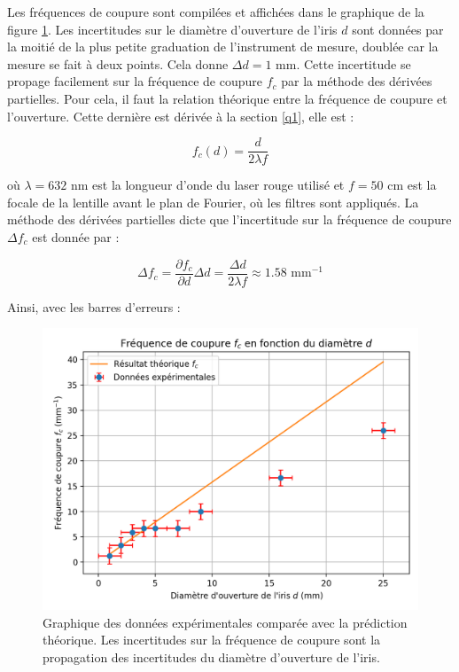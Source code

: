 \documentclass[11pt,letterpaper]{article}
\begin{document}
Les fréquences de coupure sont compilées et affichées dans le graphique de la figure \ref{plot}. Les incertitudes sur
le diamètre d'ouverture de l'iris $d$ sont données par la moitié de la plus petite graduation de l'instrument de mesure,
doublée car la mesure se fait à deux points. Cela donne $\Delta d = 1$ mm. Cette incertitude se propage facilement sur
la fréquence de coupure $f_c$  par la méthode des dérivées partielles. Pour cela, il faut la relation théorique entre la
fréquence de coupure et l'ouverture. Cette dernière est dérivée à la section \ref{q1}, elle est :

\begin{equation}
  f_c(d)= \frac{d}{2\lambda f}
  \label{eqfcoup}
\end{equation}

où $\lambda = 632$ nm est la longueur d'onde du laser rouge utilisé et $f = 50$ cm est la focale de la lentille avant le
plan de Fourier, où les filtres sont appliqués. La méthode des dérivées partielles dicte que l'incertitude sur la
fréquence de coupure $\Delta f_c$ est donnée par :

\begin{equation}
  \Delta f_c = \frac{\partial f_c}{\partial d}\Delta d = \frac{\Delta d}{2 \lambda f} \approx 1.58 \text{ mm}^{-1} 
\end{equation}

Ainsi, avec les barres d'erreurs :

\begin{figure}[H]
  \centering
  \includegraphics[scale=0.9]{graph_fc.png}
  \caption{Graphique des données expérimentales comparée avec la prédiction théorique. Les incertitudes sur la fréquence
  de coupure sont la propagation des incertitudes du diamètre d'ouverture de l'iris.}
  \label{plot}
\end{figure}
\end{document}
